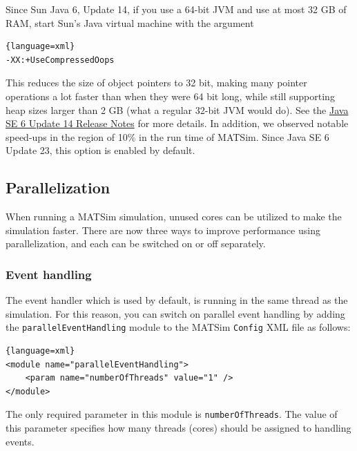 Since Sun Java 6, Update 14, if you use a 64-bit JVM and use at most 32 GB of RAM, start Sun's Java virtual machine with the argument 
\begin{lstlisting}{language=xml}
-XX:+UseCompressedOops
\end{lstlisting}
This reduces the size of object pointers to 32 bit, making many pointer operations a lot faster than when they were 64 bit long, while still supporting heap sizes larger than 2 GB (what a regular 32-bit JVM would do). See the \href{http://www.oracle.com/technetwork/java/javase/6u14-137039.html}{Java SE 6 Update 14 Release Notes} for more details. In addition, we observed notable speed-ups in the region of 10\% in the run time of MATSim. Since Java SE 6 Update 23, this option is enabled by default.

\subsection{Parallelization}
When running a MATSim simulation, unused cores can be utilized to make the simulation faster. There are now three ways to improve performance using parallelization, and each can be switched on or off separately.

\subsubsection{Event handling}\label{sec:ParallelEventsHandling}
The event handler which is used by default, is running in the same thread as the simulation. For this reason, you can switch on parallel event handling by adding the \texttt{parallelEventHandling} module to the MATSim \texttt{Config} XML file as follows:
\begin{lstlisting}{language=xml}
<module name="parallelEventHandling">
    <param name="numberOfThreads" value="1" />
</module>
\end{lstlisting}
The only required parameter in this module is \texttt{numberOfThreads}. The value of this parameter specifies how many threads (cores) should be assigned to handling events.

